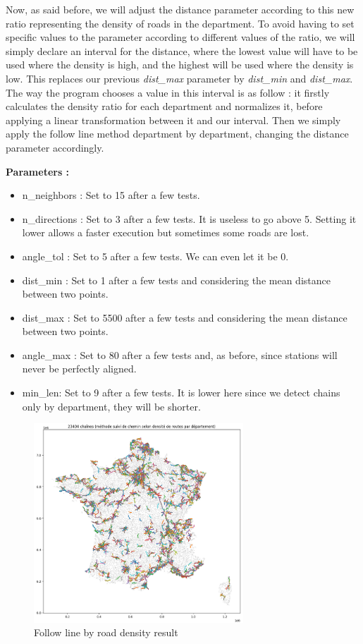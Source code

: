 \documentclass[main.tex]{subfiles}
\begin{document}
Now, as said before, we will adjust the distance parameter according to this new ratio representing the density of roads in the department. To avoid having to set specific values to the parameter according to different values of the ratio, we will simply declare an interval for the distance, where the lowest value will have to be used where the density is high, and the highest will be used where the density is low. This replaces our previous \textit{dist\_max} parameter by \textit{dist\_min} and \textit{dist\_max}. The way the program chooses a value in this interval is as follow : it firstly calculates the density ratio for each department and normalizes it, before applying a linear transformation between it and our interval. Then we simply apply the follow line method department by department, changing the distance parameter accordingly. 

\textbf{Parameters : }
\begin{itemize}
    \item n\_neighbors : Set to 15 after a few tests.
    \item n\_directions : Set to 3 after a few tests. It is useless to go above 5. Setting it lower allows a faster execution but sometimes some roads are lost.
    \item angle\_tol : Set to 5 after a few tests. We can even let it be 0.
    \item dist\_min : Set to 1 after a few tests and considering the mean distance between two points.
    \item dist\_max : Set to 5500 after a few tests and considering the mean distance between two points.
    \item angle\_max : Set to 80 after a few tests and, as before, since stations will never be perfectly aligned.
    \item min\_len: Set to 9 after a few tests. It is lower here since we detect chains only by department, they will be shorter.
\end{itemize}

\begin{figure}[H]
    \centering
    \includegraphics[width=0.7\textwidth]{Images/Res_Followline_Roaddens.png}
    \caption{Follow line by road density result}
\end{figure}
\end{document}
